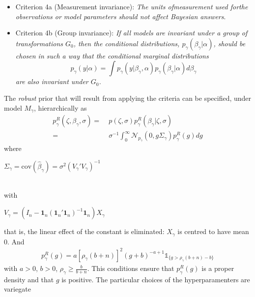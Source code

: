 \documentclass[11 pt]{article}
\begin{document}
\begin{multicols}{2}
\begin{itemize}[label={}]
    \item Criterion 4a (Measurement invariance): \textit{The units ofmeasurement used forthe observations or model parameters should not affect Bayesian answers}.
    \item Criterion 4b (Group invariance): \textit{If all models are invariant under a group of transformations $G_0$, then the conditional distributions, $p_\gamma(\beta_\gamma|\alpha)$, should be chosen in such a way that the conditional marginal distributions $$p_\gamma(y|\alpha) = \int p_\gamma(y|\beta_\gamma,\alpha)p_\gamma(\beta_\gamma|\alpha)d\beta_\gamma$$ are also invariant under $G_0$.}
\end{itemize}
The \textit{robust} prior that will result from applying the criteria can be specified, under model $M_\gamma$, hierarchically as
\begin{align*}
    p_\gamma^R(\zeta, \beta_\gamma, \sigma) =& \; p(\zeta,\sigma)p_\gamma^R(\beta_\gamma|\zeta,\sigma)\\
    =& \; \sigma^{-1} \int_0^\infty \mathcal{N}_{p_\gamma}\left(0, g\Sigma_\gamma\right) p_\gamma^R(g)dg
\end{align*}
where \centerline{$\Sigma_\gamma = \text{cov}(\hat{\beta}_\gamma)=\sigma^2\left(V_\gamma'V_\gamma\right)^{-1}$}\\
with \centerline{$V_\gamma = (I_n - \mathbf{1}_n(\mathbf{1}_n'\mathbf{1}_n)^{-1}\mathbf{1}_n)X_\gamma$}
that is, the linear effect of the constant is eliminated: $X_\gamma$ is centred to have mean 0. And
\begin{align*}
     p_\gamma^R(g) = a\left[\rho_\gamma(b+n)\right]^2\left(g+b\right)^{-a+1} \mathds{1}_{\{g>\rho_\gamma (b+n)-b\}}
\end{align*}
with $a>0$, $b>0$, $\rho_\gamma \geq \frac{b}{b+n}$. This conditions ensure that $p_\gamma^R(g)$ is a proper density and that $g$ is positive. The particular choices of the hyperparamenters are variegate

\bigskip


\end{multicols}
\end{document}
